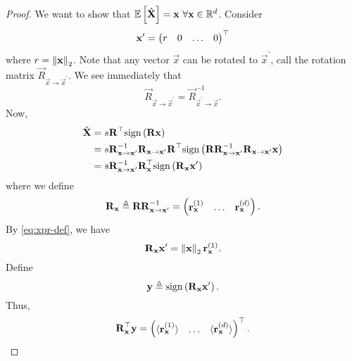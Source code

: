 \documentclass[twoside]{article}
\begin{document}
\begin{proof}
    We want to show that \(\mathbb{E}\left[ \hat{\boldsymbol{\mathbf{X}}} \right] = \boldsymbol{\mathbf{x}}\ \forall \boldsymbol{\mathbf{x}} \in 
    \mathbb R^d\). Consider
    \begin{equation}
        \boldsymbol{\mathbf{x}}^\prime = \begin{pmatrix}r & 0 & \ldots & 0\end{pmatrix}^\top
        \label{eq:xpr-def}
    \end{equation}
    where \(r = \left\lVert\boldsymbol{\mathbf{x}}\right\rVert_2\). Note that any vector \(\vec{x}\) can be 
    rotated to \(\vec{x}^\prime\), call the rotation matrix 
    \(\vec{R}_{\vec{x}\rightarrow\vec{x}^\prime}\). We see immediately that
    \begin{equation}
        \vec{R}_{\vec{x}\rightarrow\vec{x}^\prime} = \vec{R}_{\vec{x}^\prime\rightarrow\vec{x}}^{-1}.
        \label{eq:rrinv}
    \end{equation}
    Now,
    \begin{align}
        \hat{\boldsymbol{\mathbf{X}}} &= s\boldsymbol{\mathbf{R}}^\top\mathrm{sign}\left(\boldsymbol{\mathbf{Rx}}\right) \\
                      &= s\boldsymbol{\mathbf{R}}_{\boldsymbol{\mathbf{x}}\rightarrow\boldsymbol{\mathbf{x}}^\prime}^{-1}\boldsymbol{\mathbf{R}}_{\boldsymbol{\mathbf{x}}\rightarrow\boldsymbol{\mathbf{x}}^\prime}\boldsymbol{\mathbf{R}}^\top\mathrm{sign}\left(\boldsymbol{\mathbf{R}}\boldsymbol{\mathbf{R}}_{\boldsymbol{\mathbf{x}}\rightarrow\boldsymbol{\mathbf{x}}^\prime}^{-1}\boldsymbol{\mathbf{R}}_{\boldsymbol{\mathbf{x}}\rightarrow\boldsymbol{\mathbf{x}}^\prime}\boldsymbol{\mathbf{x}}\right) \\
                      &= s\boldsymbol{\mathbf{R}}_{\boldsymbol{\mathbf{x}}\rightarrow\boldsymbol{\mathbf{x}}^\prime}^{-1}\boldsymbol{\mathbf{R}}_{\boldsymbol{\mathbf{x}}}^\top\mathrm{sign}\left(\boldsymbol{\mathbf{R}}_{\boldsymbol{\mathbf{x}}}\boldsymbol{\mathbf{x}}^\prime\right) \\
    \end{align}
    where we define
    \begin{equation}
        \boldsymbol{\mathbf{R}}_{\boldsymbol{\mathbf{x}}} \triangleq \boldsymbol{\mathbf{RR}}_{\boldsymbol{\mathbf{x}}\rightarrow\boldsymbol{\mathbf{x}}^\prime}^{-1} = \begin{pmatrix}\boldsymbol{\mathbf{r}}_{\boldsymbol{\mathbf{x}}}^{\left(1\right)} & \ldots & \boldsymbol{\mathbf{r}}_{\boldsymbol{\mathbf{x}}}^{\left(d\right)}\end{pmatrix}.
        \label{eq:Rx-def}
    \end{equation}
    By \eqref{eq:xpr-def}, we have
    \begin{equation}
        \boldsymbol{\mathbf{R}}_{\boldsymbol{\mathbf{x}}}\boldsymbol{\mathbf{x}}^\prime = \left\lVert\boldsymbol{\mathbf{x}}\right\rVert_2\boldsymbol{\mathbf{r}}_{\boldsymbol{\mathbf{x}}}^{\left(1\right)}.
        \label{eq:Rxpr-val}
    \end{equation}
    Define
    \begin{equation}
        \boldsymbol{\mathbf{y}} \triangleq \mathrm{sign}\left(\boldsymbol{\mathbf{R}}_{\boldsymbol{\mathbf{x}}}\boldsymbol{\mathbf{x}}^\prime\right).
        \label{eq:y-def}
    \end{equation}
    Thus,
    \begin{equation}
        \vec{R}_{\vec{x}}^\top\vec{y} = \myvec{\langle\vec{r}_{\vec{x}}^{\brak{1}}\rangle & \ldots & \langle\vec{r}_{\vec{x}}^{\brak{d}}\rangle}^\top.
        \label{eq:Rxy-val}

\end{equation}
\end{proof}
\end{document}
